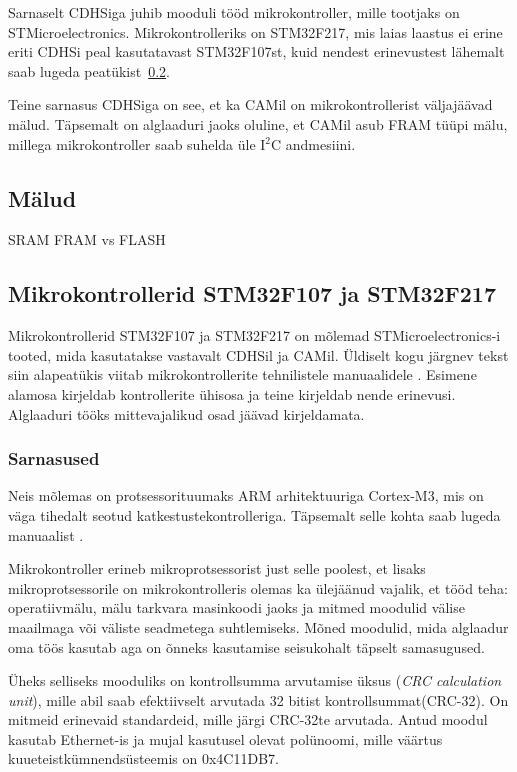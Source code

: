 \documentclass[12pt,a4paper]{article}
\newcommand{\iic}{I\({}^2\)C }
\begin{document}
Sarnaselt CDHSiga juhib mooduli tööd mikrokontroller, mille tootjaks on
STMicroelectronics. Mikrokontrolleriks on STM32F217, mis laias laastus ei erine
eriti CDHSi peal kasutatavast STM32F107st, kuid nendest erinevustest lähemalt
saab lugeda peatükist~\ref{sec:mcu}.

Teine sarnasus CDHSiga on see, et ka CAMil on mikrokontrollerist väljajäävad
mälud. Täpsemalt on alglaaduri jaoks oluline, et CAMil asub FRAM tüüpi mälu,
millega mikrokontroller saab suhelda üle \iic andmesiini.

\subsection{Mälud}
\label{sec:m2lud}
SRAM
FRAM vs FLASH

\subsection{Mikrokontrollerid STM32F107 ja STM32F217}
\label{sec:mcu}
Mikrokontrollerid STM32F107 ja STM32F217 on mõlemad STMicroelectronics-i tooted,
mida kasutatakse vastavalt CDHSil ja CAMil. Üldiselt kogu järgnev tekst siin
alapeatükis viitab mikrokontrollerite tehnilistele manuaalidele
\cite{f1rm,f2rm}. Esimene alamosa kirjeldab kontrollerite ühisosa ja teine
kirjeldab nende erinevusi. Alglaaduri tööks mittevajalikud osad jäävad
kirjeldamata.
\subsubsection{Sarnasused}
Neis mõlemas on protsessorituumaks ARM arhitektuuriga Cortex-M3, mis on väga
tihedalt seotud katkestustekontrolleriga. Täpsemalt selle kohta saab lugeda
manuaalist \cite{CM3pm}.

Mikrokontroller erineb mikroprotsessorist just selle poolest, et lisaks
mikroprotsessorile on mikrokontrolleris olemas ka ülejäänud vajalik, et tööd
teha: operatiivmälu, mälu tarkvara masinkoodi jaoks ja mitmed moodulid välise
maailmaga või väliste seadmetega suhtlemiseks. Mõned moodulid, mida alglaadur
oma töös kasutab aga on õnneks kasutamise seisukohalt täpselt samasugused.

Üheks selliseks mooduliks on kontrollsumma arvutamise üksus (\textit{CRC
calculation unit}), mille abil saab efektiivselt arvutada 32 bitist
kontrollsummat(CRC-32). On mitmeid erinevaid standardeid, mille järgi CRC-32te
arvutada. Antud moodul kasutab Ethernet-is ja mujal kasutusel olevat polünoomi,
mille väärtus kuueteistkümnendsüsteemis on 0x4C11DB7. 
\end{document}
